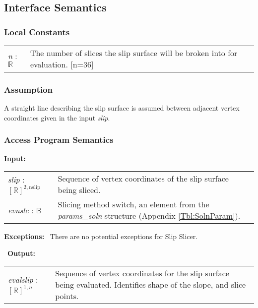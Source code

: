 \documentclass[12pt, titlepage]{article}
\begin{document}
\subsection{Interface Semantics}

\subsubsection{Local Constants}
\renewcommand*{\arraystretch}{1.5}
\begin{longtable}{p{} p{}}
  \textit{n} : $\mathbb{R}$ & The number of slices the slip surface
  will be broken into for evaluation. [n=36]\\
\end{longtable}

\subsubsection{Assumption}
A straight line describing the slip surface is assumed between
adjacent vertex coordinates given in the input \textit{slip}.

\subsubsection{Access Program Semantics}
\textbf{Input:} 
\renewcommand*{\arraystretch}{1.5}
\begin{longtable}{p{} p{}}
  \textit{slip} : $[\mathbb{R}]^{2,\text{nslip}}$ & Sequence of vertex
  coordinates of the slip surface being sliced. \\

  \textit{evnslc} : $\mathbb{B}$ & Slicing method switch, an element
  from the \textit{params\_soln} structure (Appendix
  \ref{Tbl:SolnParam}).\\
\end{longtable}

\noindent \textbf{Exceptions:} ~\newline\noindent There are no
potential exceptions for Slip Slicer.

~\newline\noindent \textbf{Output:}
\renewcommand*{\arraystretch}{1.5}
\begin{longtable}{p{} p{}}
  \textit{evalslip} : $[\mathbb{R}]^{1,n}$ & Sequence of vertex
  coordinates for the slip surface being evaluated. Identifies shape
  of the slope, and slice points. \\
\end{longtable}
\end{document}
